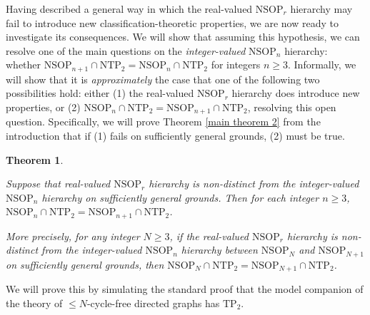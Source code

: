 \documentclass{amsart}
\newtheorem{theorem}{Theorem}[section]
\theoremstyle{definition}
\theoremstyle{remark}
\numberwithin{equation}{section}
\begin{document}
Having described a general way in which the real-valued $\mathrm{NSOP}_{r}$ hierarchy may fail to introduce new classification-theoretic properties, we are now ready to investigate its consequences. We will show that assuming this hypothesis, we can resolve one of the main questions on the \textit{integer-valued} $\mathrm{NSOP}_{n}$ hierarchy: whether $\mathrm{NSOP}_{n+1} \cap \mathrm{NTP}_{2} = \mathrm{NSOP}_{n} \cap \mathrm{NTP}_{2}$ for integers $n \geq 3$. Informally, we will show that it is \textit{approximately} the case that one of the following two possibilities hold: either (1) the real-valued $\mathrm{NSOP}_{r}$ hierarchy does introduce new properties, or (2) $\mathrm{NSOP}_{n} \cap \mathrm{NTP}_{2} = \mathrm{NSOP}_{n+1} \cap \mathrm{NTP}_{2}$, resolving this open question. Specifically, we will prove Theorem \ref{main theorem 2} from the introduction that if (1) fails on sufficiently general grounds, (2) must be true. 

\begin{theorem}\label{main theorem 2, restated}

Suppose that real-valued $\mathrm{NSOP}_{r}$ hierarchy is non-distinct from the integer-valued $\mathrm{NSOP}_{n}$ hierarchy on sufficiently general grounds. Then for each integer $n \geq 3$, $\mathrm{NSOP}_{n} \cap \mathrm{NTP}_{2} = \mathrm{NSOP}_{n+1} \cap \mathrm{NTP}_{2}$.

More precisely,  for any integer $N \geq 3$, if the real-valued $\mathrm{NSOP}_{r}$ hierarchy is non-distinct from the integer-valued $\mathrm{NSOP}_{n}$ hierarchy between $\mathrm{NSOP}_{N}$ and $\mathrm{NSOP}_{N+1}$ on sufficiently general grounds, then $\mathrm{NSOP}_{N} \cap \mathrm{NTP}_{2} = \mathrm{NSOP}_{N+1} \cap \mathrm{NTP}_{2}$.

    
\end{theorem}

We will prove this by simulating the standard proof that the model companion of the theory of $\leq N$-cycle-free directed graphs has $\mathrm{TP}_{2}$.
\end{document}
